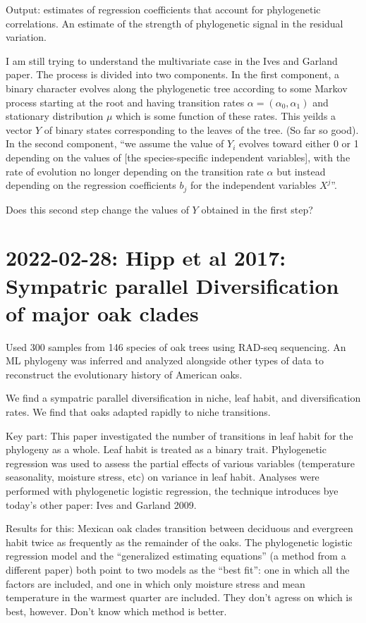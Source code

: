 \documentclass{article}
\begin{document}
Output: estimates of regression coefficients that account for phylogenetic
correlations. An estimate of the strength of phylogenetic signal in the residual
variation.


I am still trying to understand the multivariate case in the Ives and Garland
paper. The process is divided into two components. In the first component, a
binary character evolves along the phylogenetic tree according to some Markov
process starting at the root and having transition rates
$\alpha=(\alpha_{0},\alpha_{1})$ and stationary distribution $\mu$ which is some
function of these rates. This yeilds a vector $Y$ of binary states corresponding
to the leaves of the tree. (So far so good). In the second component, ``we
assume the value of $Y_{i}$ evolves toward either 0 or 1 depending on the values
of [the species-specific independent variables], with the rate of evolution no
longer depending on the transition rate $\alpha$ but instead depending on the
regression coefficients $b_{j}$ for the independent variables $X^{j}$''.

Does this second step change the values of $Y$ obtained in the first step?

\section{2022-02-28: Hipp et al 2017: Sympatric parallel Diversification of
  major oak clades}

Used 300 samples from 146 species of oak trees using RAD-seq sequencing. An ML
phylogeny was inferred and analyzed alongside other types of data to reconstruct
the evolutionary history of American oaks.

We find a sympatric parallel diversification in niche, leaf habit, and
diversification rates. We find that oaks adapted rapidly to niche transitions.

Key part: This paper investigated the number of transitions in leaf habit for
the phylogeny as a whole. Leaf habit is treated as a binary trait. Phylogenetic
regression was used to assess the partial effects of various variables
(temperature seasonality, moisture stress, etc) on variance in leaf habit.
Analyses were performed with phylogenetic logistic regression, the technique
introduces bye today's other paper: Ives and Garland 2009.

Results for this: Mexican oak clades transition between deciduous and evergreen
habit twice as frequently as the remainder of the oaks. The phylogenetic
logistic regression model and the ``generalized estimating equations'' (a method
from a different paper) both point to two models as the ``best fit'': one in
which all the factors are included, and one in which only moisture stress and
mean temperature in the warmest quarter are included. They don't agress on which
is best, however. Don't know which method is better.
\end{document}
